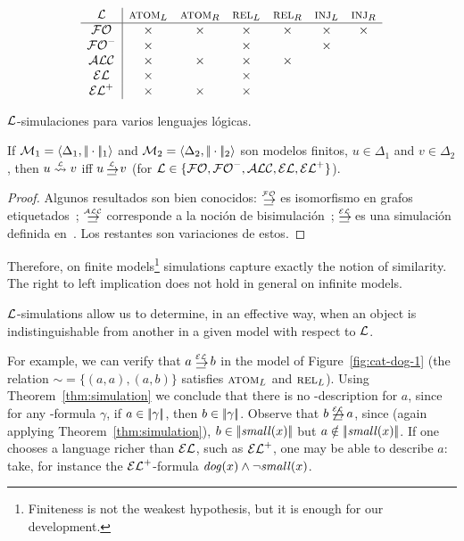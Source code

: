 \begin{table}[t]
$$
\begin{array}{c|cccccc}
  \mathcal{L} & \textsc{atom}_L & \textsc{atom}_R & \textsc{rel}_L & \textsc{rel}_R & \textsc{inj}_L\space & \textsc{inj}_R\space \\
  \hline
  \mathcal{FO}   & \times & \times & \times & \times & \times & \times\\
  {\mathcal{FO}^-} & \times & & \times && \times &\\
  \mathcal{ALC}   & \times & \times & \times & \times&&\\
  \mathcal{EL}    & \times & &  \times & &\\
  {\mathcal{EL}^+}  & \times & \times &  \times & &\\
\end{array}
$$
\caption{$\mathcal{L}$-simulaciones para varios lenguajes l\'ogicas.}\label{tab:simuls}
\end{table}

\begin{theorem} \label{thm:simulation}
If  $\mathcal{M}_1 = \langle \Delta_1, |\!|\cdot|\!|_1 \rangle$ and $\mathcal{M}_2 =
\langle \Delta_2, |\!|\cdot|\!|_2 \rangle$ son modelos finitos, $u \in
\Delta_1$ and $v \in \Delta_2$, then $u \simil{\+L} v$ iff $u
\simul{\+L} v$ (for $\mathcal{L} \in \{\mathcal{FO},{\mathcal{FO}^-},\mathcal{ALC},\mathcal{EL},{\mathcal{EL}^+}\}$).
\end{theorem}
\begin{proof}
Algunos resultados son bien conocidos: $\simul{\FOL}$ es isomorfismo en
grafos etiquetados~\cite{ebbi:math96}; $\simul{\ALC}$ corresponde a la
noci\'on de bisimulaci\'on~\cite[Def.~2.16]{BRV01}; $\simul{\EL}$ es una
simulaci\'on definida en~\cite[Def.~2.77]{BRV01}. Los restantes son variaciones de estos.
\end{proof}


Therefore, on finite models\footnote{Finiteness is not the weakest hypothesis,
but it is enough for our development.} simulations capture exactly the notion of similarity.
The right to left implication does not hold in general on infinite
models.

$\mathcal{L}$-simulations allow us to determine, in an effective way,
when an object is indistinguishable from another in a given model with respect to $\mathcal{L}$.

For example, we can verify that $a \simul{\EL} b$ in the model of
Figure~\ref{fig:cat-dog-1} (the relation ${\sim} = \{(a,a), (a, b) \}
$ satisfies $\textsc{atom}_L$ and $\textsc{rel}_L$).
Using Theorem~\ref{thm:simulation}
we conclude that there is no \EL-description for $a$, since for any \EL-formula $\gamma$,
if $a\in|\!|\gamma|\!|$, then $b\in|\!|\gamma|\!|$.
Observe that $b \not\simul{\EL} a$, since
(again applying Theorem~\ref{thm:simulation}), $b\in|\!|\mathit{small}(x)|\!|$ but
$a\notin|\!|\mathit{small}(x)|\!|$.
%
If one chooses a language richer than $\mathcal{EL}$, such as ${\mathcal{EL}^+}$, one may be
able to describe $a$: take, for instance the ${\mathcal{EL}^+}$-formula
$\mathit{dog}(x)\wedge\lnot\mathit{small}(x)$.


